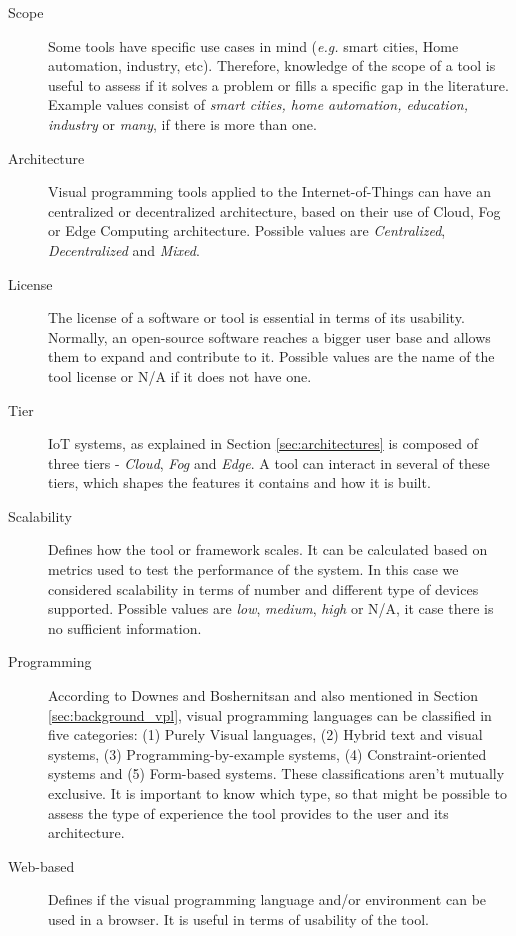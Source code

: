 \begin{description}
    \item [Scope] Some tools have specific use cases in mind (\textit{e.g.} smart cities, Home automation, industry, etc). Therefore, knowledge of the scope of a tool is useful to assess if it solves a problem or fills a specific gap in the literature. Example values consist of \textit{smart cities, home automation, education, industry} or \textit{many}, if there is more than one. 
    \item [Architecture] Visual programming tools applied to the Internet-of-Things can have an centralized or decentralized architecture, based on their use of Cloud, Fog or Edge Computing architecture. Possible values are \textit{Centralized}, \textit{Decentralized} and \textit{Mixed}.
    \item [License] The license of a software or tool is essential in terms of its usability. Normally, an open-source software reaches a bigger user base and allows them to expand and contribute to it. Possible values are the name of the tool license or N/A if it does not have one.
    \item [Tier] IoT systems, as explained in Section \ref{sec:architectures} is composed of three tiers - \textit{Cloud}, \textit{Fog} and \textit{Edge}. A tool can interact in several of these tiers, which shapes the features it contains and how it is built.
    \item [Scalability] Defines how the tool or framework scales. It can be calculated based on metrics used to test the performance of the system. In this case we considered scalability in terms of number and different type of devices supported. Possible values are \textit{low}, \textit{medium}, \textit{high} or N/A, it case there is no sufficient information.
    \item [Programming] According to Downes and Boshernitsan \cite{vpls_survey} and also mentioned in Section \ref{sec:background_vpl}, visual programming languages can be classified in five categories: (1) Purely Visual languages, (2) Hybrid text and visual systems, (3) Programming-by-example systems, (4) Constraint-oriented systems and (5) Form-based systems. These classifications aren't mutually exclusive. It is important to know which type, so that might be possible to assess the type of experience the tool provides to the user and its architecture.
    \item [Web-based] Defines if the visual programming language and/or environment can be used in a browser. It is useful in terms of usability of the tool.
\end{description}

